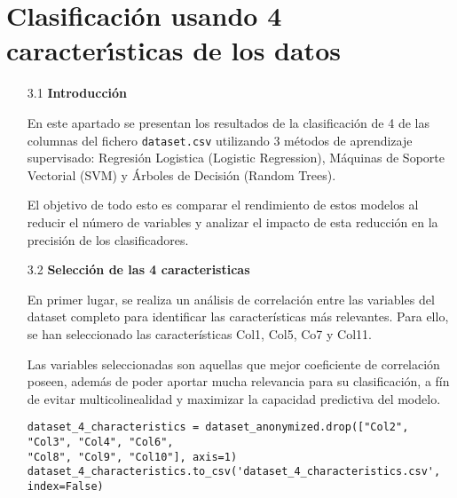 \documentclass{article}
\begin{document}
\newpage

\section[3]{Clasificaci\'on usando 4 caracter\'{\i}sticas de los datos}

\bigskip

\begin{itemize}

\item[3.1]  {\bf Introducci\'on}

En este apartado se presentan los resultados de la clasificaci\'on de 4 de las columnas del fichero \texttt{dataset.csv} utilizando 3 m\'etodos de aprendizaje supervisado: Regresi\'on Logistica (Logistic Regression), M\'aquinas de Soporte Vectorial (SVM) y \'Arboles de Decisi\'on (Random Trees).

El objetivo de todo esto es comparar el rendimiento de estos modelos al reducir el n\'umero de variables y analizar el impacto de esta reducci\'on en la precisi\'on de los clasificadores.

\end{itemize}

\bigskip

\begin{itemize}

\item[3.2]  {\bf Selecci\'on de las 4 caracteristicas}

En primer lugar, se realiza un an\'alisis de correlaci\'on entre las variables del dataset completo para identificar las caracter\'isticas m\'as relevantes. Para ello, se han seleccionado las caracter\'isticas Col1, Col5, Co7 y Col11.

Las variables seleccionadas son aquellas que mejor coeficiente de correlaci\'on poseen, adem\'as de poder aportar mucha relevancia para su clasificaci\'on, a f\'in de evitar multicolinealidad y maximizar la capacidad predictiva del modelo.

\begin{tcolorbox}[width=14cm]
\begin{scriptsize}
\begin{verbatim}
dataset_4_characteristics = dataset_anonymized.drop(["Col2", "Col3", "Col4", "Col6",
"Col8", "Col9", "Col10"], axis=1)
dataset_4_characteristics.to_csv('dataset_4_characteristics.csv', index=False)
\end{verbatim}
\end{scriptsize}
\end{tcolorbox}

\end{itemize}
\end{document}
